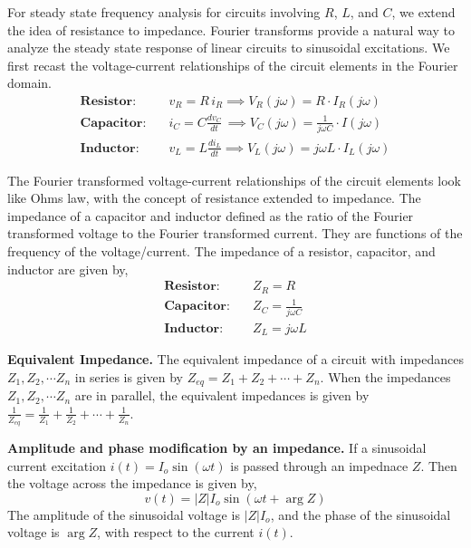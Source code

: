 For steady state frequency analysis for circuits involving $R$, $L$, and $C$, we extend the idea of resistance to impedance. Fourier transforms provide a natural way to analyze the steady state response of linear circuits to sinusoidal excitations. We first recast the voltage-current relationships of the circuit elements in the Fourier domain. 
\begin{equation}
    \begin{split}
        \textbf{Resistor:} \quad & v_R = R \, i_R \implies V_R\left(j\omega\right) = R \cdot I_R\left(j\omega\right)\\
        \textbf{Capacitor:} \quad & i_C = C\frac{d v_C}{dt} \, \implies V_C\left(j\omega\right) = \frac{1}{j\omega C} \cdot I\left(j\omega\right)\\
        \textbf{Inductor:} \quad & v_L = L \frac{d i_L}{dt} \implies V_L\left(j\omega\right) = j\omega L \cdot I_L\left(j \omega \right)
    \end{split}
    \label{eq:02-34}
\end{equation}

The Fourier transformed voltage-current relationships of the circuit elements look like Ohms law, with the concept of resistance extended to impedance. The impedance of a capacitor and inductor defined as the ratio of the Fourier transformed voltage to the Fourier transformed current. They are functions of the frequency of the voltage/current. The impedance of a resistor, capacitor, and inductor are given by,
\begin{equation}
    \begin{split}
        \textbf{Resistor:} \quad & Z_R = R\\
        \textbf{Capacitor:} \quad & Z_C = \frac{1}{j\omega C}\\
        \textbf{Inductor:} \quad & Z_L = j\omega L
    \end{split}
    \label{eq:02-35}
\end{equation}

\noindent\textbf{Equivalent Impedance.} The equivalent impedance of a circuit with impedances $Z_1, Z_2, \cdots Z_n$ in series is given by $Z_{eq} = Z_1 + Z_2 + \cdots + Z_n$. When the impedances $Z_1, Z_2, \cdots Z_n$ are in parallel, the equivalent impedances is given by $\frac{1}{Z_{eq}} = \frac{1}{Z_1} + \frac{1}{Z_2} + \cdots + \frac{1}{Z_n}$.

\noindent\textbf{Amplitude and phase modification by an impedance.} If a sinusoidal current excitation $i\left(t\right) = I_o \sin\left(\omega t\right)$ is passed through an impednace $Z$. Then the voltage across the impedance is given by,
\begin{equation}
    v\left(t\right) = \vert Z \vert I_o \sin\left(\omega t + \arg Z \right)
    \label{eq:02-36}
\end{equation}
The amplitude of the sinusoidal voltage is $\vert Z \vert I_o$, and the phase of the sinusoidal voltage is $\arg Z$, with respect to the current $i\left(t\right)$. 

